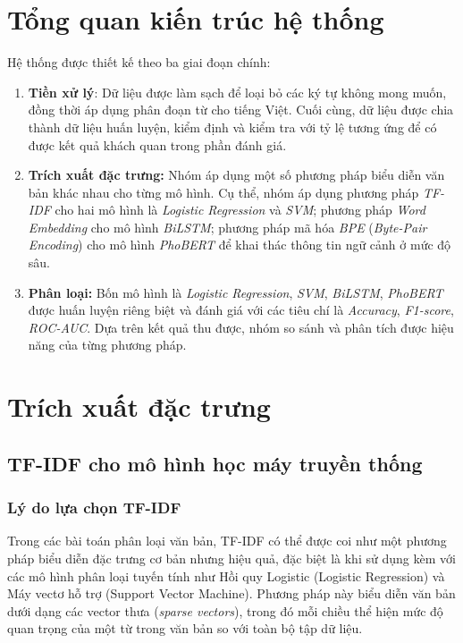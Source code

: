 \documentclass[12pt, a4paper]{report}
\begin{document}
\section{Tổng quan kiến trúc hệ thống}

Hệ thống được thiết kế theo ba giai đoạn chính:

\begin{enumerate}[leftmargin=3.3em]
  \item \textbf{Tiền xử lý}: Dữ liệu được làm sạch để loại bỏ các ký tự không mong muốn, đồng thời áp dụng phân đoạn từ cho tiếng Việt. Cuối cùng, dữ liệu được chia thành dữ liệu huấn luyện, kiểm định và kiểm tra với tỷ lệ tương ứng để có được kết quả khách quan trong phần đánh giá.

  \item \textbf{Trích xuất đặc trưng:} Nhóm áp dụng một số phương pháp biểu diễn văn bản khác nhau cho từng mô hình. Cụ thể, nhóm áp dụng phương pháp \textit{TF-IDF} cho hai mô hình là \textit{Logistic Regression} và \textit{SVM}; phương pháp \textit{Word Embedding} cho mô hình \textit{BiLSTM}; phương pháp mã hóa \textit{BPE} (\textit{Byte-Pair Encoding}) cho mô hình \textit{PhoBERT} để khai thác thông tin ngữ cảnh ở mức độ sâu.

  \item \textbf{Phân loại:} Bốn mô hình là \textit{Logistic Regression}, \textit{SVM}, \textit{BiLSTM}, \textit{PhoBERT} được huấn luyện riêng biệt và đánh giá với các tiêu chí là \textit{Accuracy}, \textit{F1-score}, \textit{ROC-AUC}. Dựa trên kết quả thu được, nhóm so sánh và phân tích được hiệu năng của từng phương pháp.
\end{enumerate}

\section{Trích xuất đặc trưng}

\subsection{TF-IDF cho mô hình học máy truyền thống}

\subsubsection{Lý do lựa chọn TF-IDF}

Trong các bài toán phân loại văn bản, TF-IDF có thể được coi như một phương pháp biểu diễn đặc trưng cơ bản nhưng hiệu quả, đặc biệt là khi sử dụng kèm với các mô hình phân loại tuyến tính như Hồi quy Logistic (Logistic Regression) và Máy vectơ hỗ trợ (Support Vector Machine). Phương pháp này biểu diễn văn bản dưới dạng các vector thưa (\textit{sparse vectors}), trong đó mỗi chiều thể hiện mức độ quan trọng của một từ trong văn bản so với toàn bộ tập dữ liệu.
\end{document}
